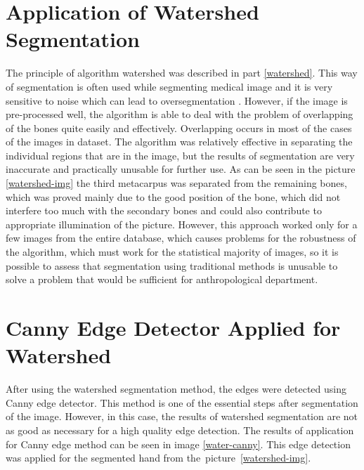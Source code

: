 \section{Application of Watershed Segmentation}
The principle of algorithm watershed was described in part \ref{watershed}. This way of segmentation is often used while segmenting medical image and it is very sensitive to noise which can lead to oversegmentation \cite{many-approaches, third-metacarpal-approach}. However, if the image is pre-processed well, the algorithm is able to deal with the problem of overlapping of the bones quite easily and effectively. Overlapping occurs in most of the cases of the images in dataset. The algorithm was relatively effective in separating the individual regions that are in the image, but the results of segmentation are very inaccurate and practically unusable for further use. As can be seen in the picture \ref{watershed-img} the third metacarpus was separated from the remaining bones, which was proved mainly due to the good position of the bone, which did not interfere too much with the secondary bones and could also contribute to appropriate illumination of the picture. However, this approach worked only for a few images from the entire database, which causes problems for the robustness of the algorithm, which must work for the statistical majority of images, so it is possible to assess that segmentation using traditional methods is unusable to solve a problem that would be sufficient for anthropological department.

\section{Canny Edge Detector Applied for Watershed}
After using the watershed segmentation method, the edges were detected using Canny edge detector. This method is one of the essential steps after segmentation of the image. However, in this case, the results of watershed segmentation are not as good as necessary for a high quality edge detection. The results of application for Canny edge method can be seen in image \ref{water-canny}. This edge detection was applied for the segmented hand from the~picture~\ref{watershed-img}.

